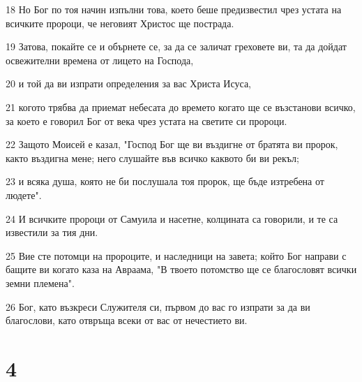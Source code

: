 \par 18 Но Бог по тоя начин изпълни това, което беше предизвестил чрез устата на всичките пророци, че неговият Христос ще пострада.
\par 19 Затова, покайте се и обърнете се, за да се заличат греховете ви, та да дойдат освежителни времена от лицето на Господа,
\par 20 и той да ви изпрати определения за вас Христа Исуса,
\par 21 когото трябва да приемат небесата до времето когато ще се възстанови всичко, за което е говорил Бог от века чрез устата на светите си пророци.
\par 22 Защото Моисей е казал, "Господ Бог ще ви въздигне от братята ви пророк, както въздигна мене; него слушайте във всичко каквото би ви рекъл;
\par 23 и всяка душа, която не би послушала тоя пророк, ще бъде изтребена от людете".
\par 24 И всичките пророци от Самуила и насетне, колцината са говорили, и те са известили за тия дни.
\par 25 Вие сте потомци на пророците, и наследници на завета; който Бог направи с бащите ви когато каза на Авраама, "В твоето потомство ще се благословят всички земни племена".
\par 26 Бог, като възкреси Служителя си, първом до вас го изпрати за да ви благослови, като отвръща всеки от вас от нечестието ви.

\chapter{4}

